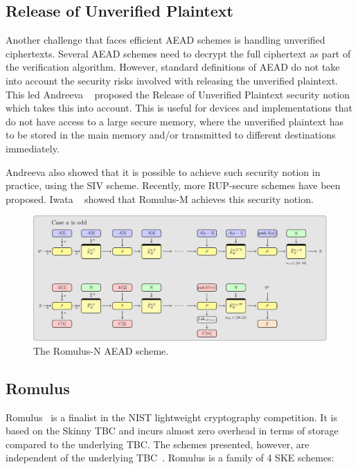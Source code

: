 \documentclass[conference]{IEEEtran}
\begin{document}
\subsection{Release of Unverified Plaintext}

Another challenge that faces efficient AEAD schemes is handling unverified ciphertexts. Several AEAD schemes need to decrypt the full ciphertext as part of the verification algorithm. However, standard definitions of AEAD do not take into account the security risks involved with releasing the unverified plaintext. This led Andreeva \etal~\cite{} proposed the Release of Unverified Plaintext security notion which takes this into account. This is useful for devices and implementations that do not have access to a large secure memory, where the unverified plaintext has to be stored in the main memory and/or transmitted to different destinations immediately.

Andreeva \etal also showed that it is possible to achieve such security notion in practice, using the SIV scheme. Recently, more RUP-secure schemes have been proposed. Iwata \etal~\cite{newresultsromulus} showed that Romulus-M achieves this security notion.

\begin{figure}[!t]
  \centering
  \includegraphics[width=\textwidth]{figures/mode_simplified.pdf}
  \caption{The Romulus-N AEAD scheme.}\label{fig:romulusn}
\end{figure}

\subsection{Romulus}

Romulus~\cite{romulusspecs} is a finalist in the NIST lightweight cryptography competition. It is based on the Skinny TBC and incurs almost zero overhead in terms of storage compared to the underlying TBC. The schemes presented, however, are independent of the underlying TBC~\cite{romulusduel}. Romulus is a family of 4 SKE schemes:
\end{document}
